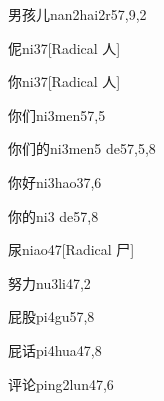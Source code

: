 \begin{verbete}{男孩儿}{nan2hai2r5}{7,9,2}
\end{verbete}

\begin{verbete}{伲}{ni3}{7}[Radical 人]
\end{verbete}

\begin{verbete}{你}{ni3}{7}[Radical 人]
\end{verbete}

\begin{verbete}{你们}{ni3men5}{7,5}
\end{verbete}

\begin{verbete}{你们的}{ni3men5 de5}{7,5,8}
\end{verbete}

\begin{verbete}{你好}{ni3hao3}{7,6}
\end{verbete}

\begin{verbete}{你的}{ni3 de5}{7,8}
\end{verbete}

\begin{verbete}{尿}{niao4}{7}[Radical 尸]
\end{verbete}

\begin{verbete}{努力}{nu3li4}{7,2}
\end{verbete}

\begin{verbete}{屁股}{pi4gu5}{7,8}
\end{verbete}

\begin{verbete}{屁话}{pi4hua4}{7,8}
\end{verbete}

\begin{verbete}{评论}{ping2lun4}{7,6}
\end{verbete}

